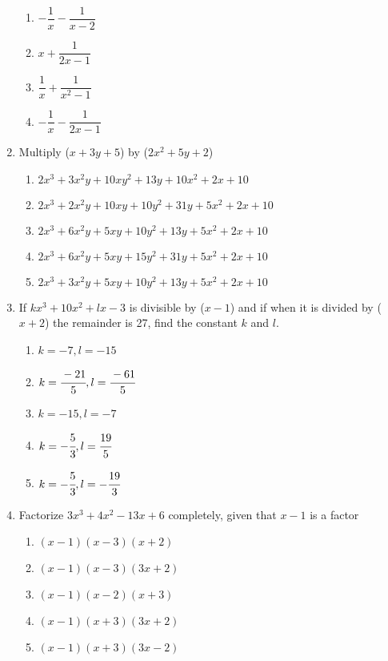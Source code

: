 \begin{multicols}{2}
\begin{enumerate}[label={\arabic*.}]
\begin{enumerate}[label={\Alph*.}]
        \item \( -\dfrac{1}{x} - \dfrac{1}{x - 2}\)
        \item \(x + \dfrac{1}{2x - 1}\)
        \item \(\dfrac{1}{x} + \dfrac{1}{{x}^{2} - 1}\)
        \item \(-\dfrac{1}{x} - \dfrac{1}{2x - 1}\)
      \end{enumerate}
    \item Multiply (\(x + 3y + 5\)) by (\(2{x}^{2} + 5y + 2\))
      \begin{enumerate}[label={\Alph*.}]
        \item \(2{x}^{3} + 3{x}^{2}y + 10xy^2 + 13y + 10{x}^{2} + 2x + 10\)
        \item \(2{x}^{3} + 2{x}^{2}y + 10xy + 10y^2 +  31y + 5{x}^{2} + 2x + 10\)
        \item \(2{x}^{3} + 6{x}^{2}y + 5xy + 10y^2 + 13y + 5{x}^{2} + 2x + 10\)
        \item \(2{x}^{3} + 6{x}^{2}y + 5xy + 15y^2 + 31y + 5{x}^{2} + 2x + 10\)
        \item \(2{x}^{3} + 3{x}^{2}y + 5xy + 10y^2 + 13y + 5{x}^{2} + 2x + 10\)
      \end{enumerate}
    \item If \(k{x}^{3} +   10{x}^{2} + lx - 3\) is divisible by (\(x - 1\)) and if when it is divided by (\(x + 2\)) the remainder is 27,
      find the constant \(k\) and \(l\).
      \begin{enumerate}[label={\Alph*.}]
        \item \(k = -7, l = -15\)
        \item \(k = \cfrac{-21}{5}, l = \cfrac{-61}{5}\)
        \item \(k =-15, l =-7\)
        \item \(k = -\cfrac{5}{3}, l = \cfrac{19}{5}\)
        \item \(k = -\cfrac{5}{3}, l = -\cfrac{19}{3}\)
      \end{enumerate}
    \item Factorize \(3{x}^{3} + 4{x}^{2} - 13x + 6\) completely, given that \(x - 1\) is a factor
      \begin{enumerate}[label={\Alph*.}]
        \item \((x-1)(x-3)(x+2)\)
        \item \((x-1)(x-3)(3x+2)\)
        \item \((x-1)(x-2)(x+3)\)
        \item \((x-1)(x+3)(3x+2)\)
        \item \((x-1)(x+3)(3x-2)\)

\end{enumerate}
\end{enumerate}
\end{multicols}
